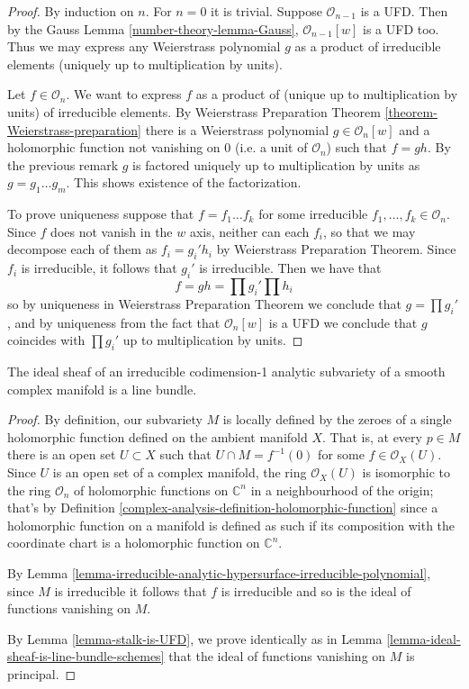 \begin{proof}
By induction on $n$. For $n=0$ it is trivial. Suppose $\mathcal{O}_{n-1}$ is a
UFD. Then by the Gauss Lemma 
\ref{number-theory-lemma-Gauss}, $\mathcal{O}_{n-1}[w]$ is a UFD
too. Thus we may express any Weierstrass polynomial $g$ as a product of
irreducible elements (uniquely up to multiplication by units).

Let $f\in \mathcal{O}_n$. We want to express $f$ as a product of (unique up to
multiplication by units) of irreducible elements. By Weierstrass Preparation
Theorem \ref{theorem-Weierstrass-preparation} there is a Weierstrass polynomial
$g\in\mathcal{O}_n[w]$ and a holomorphic function not vanishing on $0$ (i.e. a
unit of $\mathcal{O}_n$) such that $f=gh$. By the previous remark $g$ is
factored uniquely up to multiplication by units as $g=g_1\ldots g_m$. This shows
existence of the factorization.

To prove uniqueness suppose that $f=f_1\ldots f_k$ for some irreducible
$f_1,\ldots,f_k\in\mathcal{O}_n$. Since $f$ does not vanish in the $w$ axis,
neither can each $f_i$, so that we may decompose each of them as  $f_i=g_i'h_i$
by Weierstrass Preparation Theorem. Since $f_i$ is irreducible, it follows that
$g_i'$ is irreducible. Then we have that $$ f=gh=\prod g_i'\prod h_i $$ so by
uniqueness in Weierstrass Preparation Theorem we conclude that $g=\prod g_i'$,
and by uniqueness from the fact that  $\mathcal{O}_n[w]$ is a UFD we conclude
that $g$ coincides with $\prod g_i'$ up to multiplication by units.
\end{proof}

\begin{lemma}
\label{lemma-ideal-sheaf-is-line-bundle-analytic-varieties}
The ideal sheaf of an irreducible codimension-1 analytic subvariety of a smooth
complex manifold is a line bundle.
\end{lemma}

\begin{proof}
By definition, our subvariety $M$ is locally defined by the zeroes of a single 
holomorphic function defined on the ambient manifold $X$. That is,
at every $p\in M$ there is an open set $U\subset X$ such that $U\cap
M=f^{-1}(0)$ for some $f\in\mathcal{O}_X(U)$. Since $U$ is an open set of a
complex manifold, the ring $\mathcal{O}_X(U)$ is isomorphic to the ring
$\mathcal{O}_n$ of holomorphic functions on $\mathbb{C}^n$ in a neighbourhood of
the origin; that's by Definition 
\ref{complex-analysis-definition-holomorphic-function} since a
holomorphic function on a manifold is defined as such if its composition with
the coordinate chart is a holomorphic function on $\mathbb{C}^n$.

By Lemma
\ref{lemma-irreducible-analytic-hypersurface-irreducible-polynomial}, since $M$
is irreducible it follows that $f$ is irreducible and so is the ideal of
functions vanishing on $M$.

By Lemma \ref{lemma-stalk-is-UFD}, we prove identically as in Lemma 
\ref{lemma-ideal-sheaf-is-line-bundle-schemes} that the ideal of functions
vanishing on $M$ is principal.
\end{proof}

